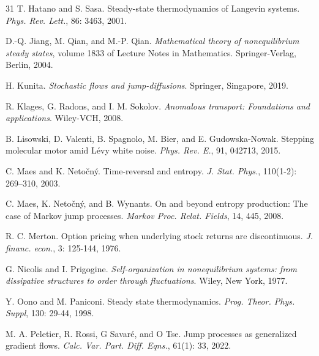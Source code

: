 \documentclass[10pt]{article}
\theoremstyle{definition}
\numberwithin{equation}{section}
\begin{document}
\begin{thebibliography}{31}
 T. Hatano and S. Sasa. Steady-state thermodynamics of Langevin systems. {\it Phys. Rev. Lett.}, 86: 3463, 2001.


 D.-Q. Jiang, M. Qian, and M.-P. Qian. {\it Mathematical theory of nonequilibrium steady states}, volume 1833 of Lecture Notes in Mathematics. Springer-Verlag, Berlin, 2004.

 H. Kunita. {\it Stochastic flows and jump-diffusions}. Springer, Singapore, 2019.

 R. Klages, G. Radons, and I. M. Sokolov. {\it Anomalous transport: Foundations and applications}. Wiley-VCH, 2008.


 B. Lisowski, D. Valenti, B. Spagnolo, M. Bier, and E. Gudowska-Nowak. Stepping molecular motor amid L\'{e}vy white noise. {\it Phys. Rev. E.}, 91, 042713, 2015.

 C. Maes and K. Neto\v{c}n\'{y}. Time-reversal and entropy. {\it J. Stat. Phys.}, 110(1-2): 269--310, 2003.

 C. Maes, K. Neto\v{c}n\'{y}, and B. Wynants. On and beyond entropy production: The case of Markov jump processes. {\it Markov Proc. Relat. Fields}, 14, 445, 2008.

 R. C. Merton. Option pricing when underlying stock returns are discontinuous. {\it J. financ. econ.}, 3: 125-144, 1976.


 G. Nicolis and I. Prigogine. {\it Self-organization in nonequilibrium systems: from dissipative structures to order through fluctuations}. Wiley, New York, 1977.

 Y. Oono and M. Paniconi.  Steady state thermodynamics. {\it Prog. Theor. Phys. Suppl}, 130: 29-44, 1998.

 M. A. Peletier, R. Rossi, G Savaré, and O Tse. Jump processes as generalized gradient flows. {\it Calc. Var. Part. Diff. Eqns.}, 61(1): 33, 2022.


\end{thebibliography}
\end{document}
